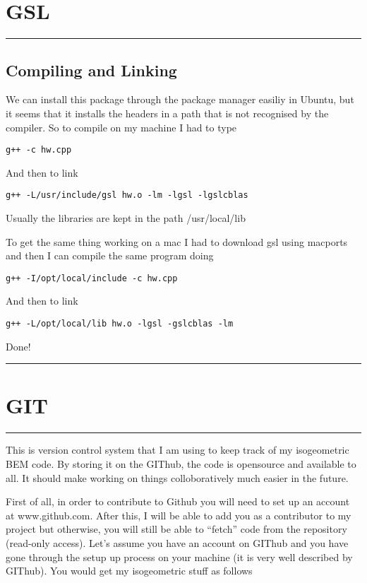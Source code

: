 \documentclass[a4paper, 10pt]{article}
\newcommand{\mytoprule}{\hrule\vspace{4mm}}
\newcommand{\mybotrule}{\vspace{4mm}\hrule}
\begin{document}
\vspace{10mm}
\section*{GSL}

\mytoprule
\subsection*{Compiling and Linking}
We can install this package through the package manager easiliy in Ubuntu, but it seems that it installs the headers in a path that is not recognised by the compiler. So to compile on my machine I had to type
\begin{Verbatim}
g++ -c hw.cpp 
\end{Verbatim}
And then to link
\begin{Verbatim}
g++ -L/usr/include/gsl hw.o -lm -lgsl -lgslcblas
\end{Verbatim}
Usually the libraries are kept in the path /usr/local/lib

To get the same thing working on a mac I had to download gsl using macports and then I can compile the same program doing
\begin{Verbatim}
g++ -I/opt/local/include -c hw.cpp
\end{Verbatim}
And then to link
\begin{Verbatim}
g++ -L/opt/local/lib hw.o -lgsl -gslcblas -lm
\end{Verbatim}
Done!
\mybotrule

%

\vspace{10mm}
\section*{GIT}
\mytoprule

This is version control system that I am using to keep track of my isogeometric BEM code. By storing it on the GIThub, the code is opensource and available to all. It should make working on things colloboratively much easier in the future. 

First of all, in order to contribute to Github you will need to set up an account at www.github.com. After this, I will be able to add you as a contributor to my project but otherwise, you will still be able to ``fetch'' code from the repository (read-only access). Let's assume you have an account on GIThub and you have gone through the setup up process on your machine (it is very well described by GIThub). You would get my isogeometric stuff as follows
\end{document}
